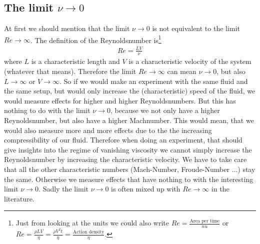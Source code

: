 \subsection{The limit $\nu \longrightarrow 0$}
At first we should mention that the limit $\nu \longrightarrow 0$ is not
equivalent to the limit $Re \longrightarrow \infty$. The definition of the
Reynoldsnumber is\footnote{Just from looking at the units we could also write
$Re=\frac{\text{Area per time}}{nu}$ or 
$Re=\frac{\rho L V}{\eta} = \frac{\rho V^2 t}{\eta} 
= \frac{\text{Action density}}{\eta}$.} 
\begin{align}
Re = \frac{L V}{\nu}
\end{align}
where $L$ is a characteristic length and $V$ is a characteristic velocity 
of the system (whatever that means). Therefore the limit 
$Re \longrightarrow \infty$ can mean 
$\nu \longrightarrow 0$, but also $L \longrightarrow \infty$ or 
$V \longrightarrow \infty $. So if we would make an experiment with the same
fluid and the same setup, but would only increase the (characteristic) speed
of the fluid, we would measure effects for higher and higher Reynoldsnumbers.
But this has nothing to do with the limit $\nu \longrightarrow 0$, because 
we not only have a higher Reynoldsnumber, but also have a higher Machnumber.
This would mean, that we would also measure more and more effects due to the
the increasing compressibility of our fluid. Therefore when doing an
experiment, that should give insights into the regime of vanishing viscosity
we cannot simply increase the Reynoldsnumber by increasing the 
characteristic velocity. We  have to take care that all the other
characteristic numbers (Mach-Number, Froude-Number ...) stay the same. 
Otherwise we measure effects that have nothing to with the interesting limit
$\nu \longrightarrow 0$. Sadly the limit $\nu \longrightarrow 0$ is often mixed
up with $Re \longrightarrow \infty$ in the literature.

